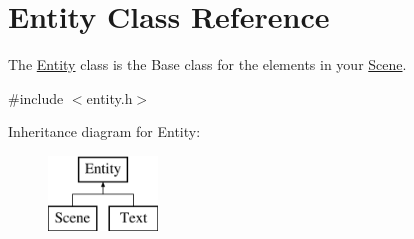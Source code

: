 \hypertarget{class_entity}{}\section{Entity Class Reference}
\label{class_entity}


The \hyperlink{class_entity}{Entity} class is the Base class for the elements in your \hyperlink{class_scene}{Scene}.  




{\ttfamily \#include $<$entity.\+h$>$}

Inheritance diagram for Entity\+:\begin{figure}[H]
\begin{center}
\leavevmode
\includegraphics[height=2.000000cm]{class_entity}
\end{center}
\end{figure}
